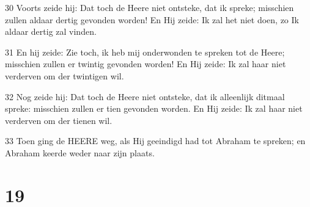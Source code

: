\par 30 Voorts zeide hij: Dat toch de Heere niet ontsteke, dat ik spreke; misschien zullen aldaar dertig gevonden worden! En Hij zeide: Ik zal het niet doen, zo Ik aldaar dertig zal vinden.
\par 31 En hij zeide: Zie toch, ik heb mij onderwonden te spreken tot de Heere; misschien zullen er twintig gevonden worden! En Hij zeide: Ik zal haar niet verderven om der twintigen wil.
\par 32 Nog zeide hij: Dat toch de Heere niet ontsteke, dat ik alleenlijk ditmaal spreke: misschien zullen er tien gevonden worden. En Hij zeide: Ik zal haar niet verderven om der tienen wil.
\par 33 Toen ging de HEERE weg, als Hij geeindigd had tot Abraham te spreken; en Abraham keerde weder naar zijn plaats.

\chapter{19}

